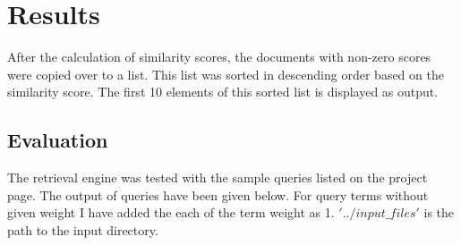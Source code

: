 \documentclass[paper=a4, fontsize=11pt]{scrartcl}
\numberwithin{equation}{section}		%
\numberwithin{figure}{section}			%
\numberwithin{table}{section}				%
\begin{document}
\section{Results}

After the calculation of similarity scores, the documents with non-zero scores were copied over to a list. This list was sorted in descending order based on the similarity score. The first 10 elements of this sorted list is displayed as output.  

\subsection{Evaluation}

The retrieval engine was tested with the sample queries listed on the project page. The output of queries have been given below. For query terms without given weight I have added the each of the term weight as 1. $'../input\_files'$ is the path to the input directory.
\end{document}
